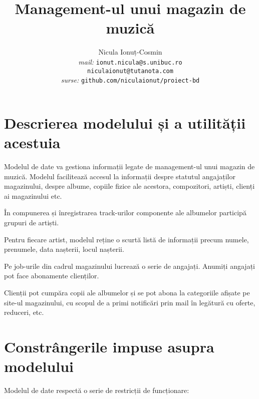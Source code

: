 \documentclass[a4paper, oneside, 12pt]{article}
\title{Management-ul unui magazin de muzică}
\author{Nicula Ionuț-Cosmin \\ \emph{mail: }\texttt{ionut.nicula@s.unibuc.ro}
        \\\hspace{35pt}\texttt{niculaionut@tutanota.com}
\\ \emph{surse: }\texttt{github.com/niculaionut/proiect-bd}}
\begin{document}
\maketitle

\newpage

\tableofcontents

\newpage

\section{Descrierea modelului și a utilității acestuia}

Modelul de date va gestiona informații legate de management-ul unui magazin de
muzică. Modelul facilitează accesul la informații despre statutul angajaților
magazinului, despre albume, copiile fizice ale acestora, compozitori, artiști,
clienți ai magazinului etc.

În compunerea și înregistrarea track-urilor componente ale albumelor participă grupuri de artiști.

Pentru fiecare artist, modelul reține o scurtă listă de informații precum numele, prenumele, data
nașterii, locul nașterii.

Pe job-urile din cadrul magazinului lucrează o serie de angajați. Anumiți
angajați pot face abonamente clienților.

Clienții pot cumpăra copii ale albumelor și se pot abona la categoriile afișate pe site-ul magazinului, cu scopul de a primi notificări prin mail în legătură cu oferte, reduceri, etc.

\section{Constrângerile impuse asupra modelului}

Modelul de date respectă o serie de restricții de funcționare:
\end{document}
